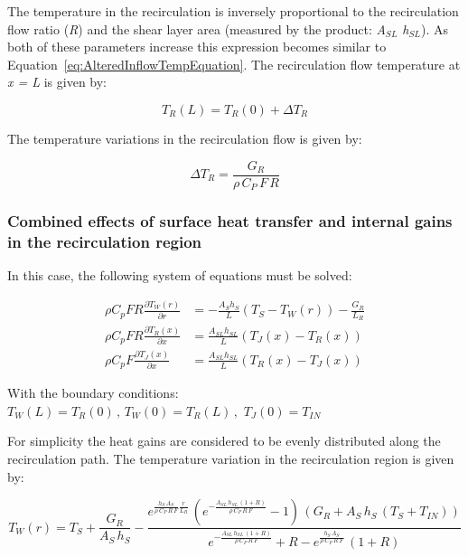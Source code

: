 The temperature in the recirculation is inversely proportional to the recirculation flow ratio (\emph{R}) and the shear layer area (measured by the product: \emph{A\(_{SL}\) h\(_{SL}\)}). As both of these parameters increase this expression becomes similar to Equation~\ref{eq:AlteredInflowTempEquation}. The recirculation flow temperature at \emph{x = L} is given by:

\begin{equation}
{T_R}(L) = {T_R}(0) + \Delta {T_R}
\end{equation}

The temperature variations in the recirculation flow is given by:

\begin{equation}
\Delta {T_R} = \frac{{{G_R}}}{{\rho \,{C_P}\,F\,R}}
\end{equation}

\subsubsection{Combined effects of surface heat transfer and internal gains in the recirculation region}\label{combined-effects-of-surface-heat-transfer-and-internal-gains-in-the-recirculation-region}

In this case, the following system of equations must be solved:

\begin{equation}
\begin{array}{rl}
    \rho C_p F R \frac{\partial T_W \left(r\right)}{\partial r} & = -\frac{A_S h_S}{L} \left(T_S - T_W \left(r\right)\right) - \frac{G_R}{L_R} \\
    \rho C_p F R \frac{\partial T_R \left(x\right)}{\partial x} & = \frac{A_{SL} h_{SL}}{L} \left(T_J\left(x\right) - T_R \left(x\right)\right) \\
    \rho C_p F \frac{\partial T_J \left(x\right)}{\partial x} & = \frac{A_{SL} h_{SL}}{L} \left(T_R\left(x\right) - T_J \left(x\right)\right)
  \end{array}
\end{equation}

With the boundary conditions: \({T_W}(L) = {T_R}(0)\,,\,{T_W}(0) = {T_R}(L)\,,\,\,{T_J}(0) = {T_{IN}}\)

For simplicity the heat gains are considered to be evenly distributed along the recirculation path. The temperature variation in the recirculation region is given by:

\begin{equation}
{T_W}(r) = {T_S} + \frac{{{G_R}}}{{{A_S}\,{h_S}}} - \frac{{{e^{\frac{{{h_S}\,{A_S}}}{{\rho \,{C_P}\,R\,F}}\frac{r}{{{L_R}}}}}\,({e^{ - \frac{{{A_{SL}}\,{h_{SL}}\,(1 + R)}}{{\rho \,{C_P}\,R\,F}}}} - 1)\,({G_R} + {A_S}\,{h_S}\,({T_S} + {T_{IN}}))}}{{{e^{ - \frac{{{A_{SL}}\,{h_{SL}}\,(1 + R)}}{{\rho \,{C_P}\,R\,F}}}} + R - {e^{\frac{{{h_S}\,{A_S}}}{{\rho \,{C_P}\,R\,F}}}}\,(1 + R)}}
\end{equation}

